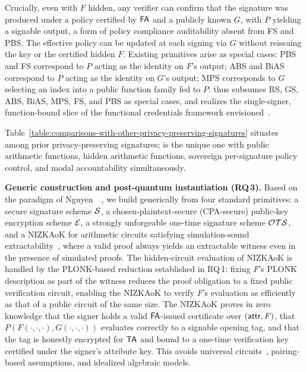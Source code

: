 Crucially, even with $F$ hidden, any verifier can confirm that
the signature was produced under a policy certified by $\mathsf{FA}$
and a publicly known $G$, with $P$ yielding a signable output,
a form of policy compliance auditability absent from FS and PBS.
The effective policy can be updated at each signing via $G$
without reissuing the key or the certified hidden $F$.
Existing primitives arise as special cases:
PBS and {FS} correspond to $P$ acting as the identity on $F$'s output;
{ABS} and {BiAS} correspond to $P$ acting as the identity on $G$'s output;
{MPS} corresponds to $G$ selecting an index into a public function family fed to $P$.
\SMS thus subsumes {RS}, {GS}, {ABS}, {BiAS},
{MPS}, {FS}, and {PBS} as special cases,
and realizes the single-signer, function-bound slice of the functional credentials framework envisioned~\cite{iotpts/Chow16}.



Table~\ref{table:comparisons-with-other-privacy-preserving-signatures} situates \SMS
among prior privacy-preserving signatures;
\SMS is the unique one with public arithmetic functions,
hidden arithmetic functions, 
sovereign per-signature policy control,
and modal accountability simultaneously.

\medskip
\noindent\textbf{Generic construction and post-quantum instantiation (RQ\,3).}
Based on the paradigm of Nguyen~\etal~\cite{CRYPTO:NGSY22},
we build \SMS generically from four standard primitives:
a secure signature scheme $\mathcal{S}$,
a chosen-plaintext-secure (CPA-secure) public-key encryption scheme $\mathcal{E}$,
a strongly unforgeable one-time signature scheme $\mathcal{OTS}$,
and a NIZKAoK for arithmetic circuits
satisfying simulation-sound extractability~\cite{CRYPTO:ChaLys06},
where a valid proof always yields an extractable witness
even in the presence of simulated proofs.
The hidden-circuit evaluation of NIZKAoK
is handled by the PLONK-based reduction established in RQ\,1:
fixing $F$'s PLONK description as part of the witness
reduces the proof obligation to a fixed public verification circuit,
enabling the NIZKAoK to verify $F$'s evaluation as efficiently as that of a public circuit of the same size.
The NIZKAoK proves in zero knowledge that
the signer holds a valid $\mathsf{FA}$-issued certificate over $(\mathsf{attr}, F)$,
that $P(F(\cdot, \cdot, \cdot), G(\cdot, \cdot, \cdot))$ evaluates correctly
to a signable opening tag,
and that the tag is honestly encrypted for $\mathsf{TA}$ and bound to
a one-time verification key certified under the signer's attribute key.
This avoids universal circuits~\cite{STOC:Valiant76},
pairing-based assumptions, and idealized algebraic models.

